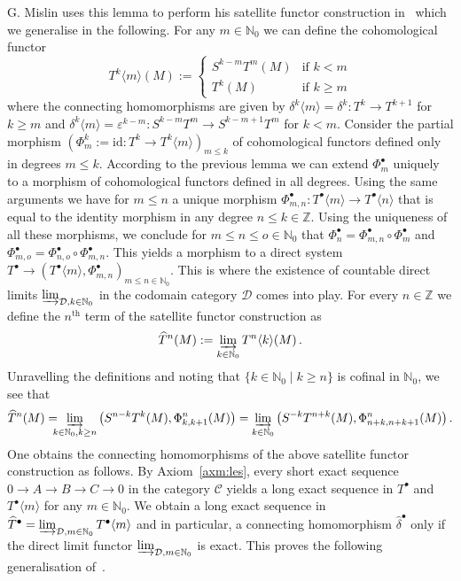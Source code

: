 \documentclass[12pt,a4paper]{article}
\numberwithin{equation}{section}
\theoremstyle{nonumberplain}
\begin{document}
G.\! Mislin uses this lemma to perform his satellite functor construction in~\cite[pp.~295--296]{mis94} which we generalise in the following. For any $m \in \mathbb{N}_0$ we can define the cohomological functor
\begin{equation}\label{eq:directsyscohomfunctor}
T^k \langle m \rangle (M) := \begin{cases} S^{k-m}T^m(M) &\text{if } k < m \\ T^k(M) &\text{if } k \geq m \end{cases}
\end{equation}
where the connecting homomorphisms are given by $\delta^k \langle m \rangle = \delta^k: T^k \rightarrow T^{k+1}$ for $k \geq m$ and $\delta^k \langle m \rangle = \varepsilon^{k-m}: S^{k-m}T^m \rightarrow S^{k-m+1}T^m$ for $k < m$. Consider the partial morphism $(\Phi_m^k := \mathrm{id}: T^k \rightarrow T^k \langle m \rangle)_{m \leq k}$ of cohomological functors defined only in degrees $m \leq k$. According to the previous lemma we can extend $\Phi_m^{\bullet}$ uniquely to a morphism of cohomological functors defined in all degrees. Using the same arguments we have for $m \leq n$ a unique morphism $\Phi_{m, n}^{\bullet}: T^{\bullet} \langle m \rangle \rightarrow T^{\bullet} \langle n \rangle$ that is equal to the identity morphism in any degree $n \leq k \in \mathbb{Z}$. Using the uniqueness of all these morphisms, we conclude for $m \leq n \leq o \in \mathbb{N}_0$ that $\Phi_n^{\bullet} = \Phi_{m,n}^{\bullet} \circ \Phi_m^{\bullet}$ and $\Phi_{m,o}^{\bullet} = \Phi_{n,o}^{\bullet} \circ \Phi_{m,n}^{\bullet}$. This yields a morphism to a direct system $T^{\bullet} \rightarrow (T^{\bullet} \langle m \rangle, \Phi_{m,n}^{\bullet})_{m \leq n \in \mathbb{N}_0}$. This is where the existence of countable direct limits $\varinjlim_{\mathcal{D}, k \in \mathbb{N}_0}$ in the codomain category $\mathcal{D}$ comes into play. For every $n \in \mathbb{Z}$ we define the $n^{\text{th}}$ term of the satellite functor construction as
\[ \widehat{T}^n(M) := \varinjlim_{k \in \mathbb{N}_0} T^n \langle k \rangle(M) \, . \]
Unravelling the definitions and noting that $\lbrace k \in \mathbb{N}_0 \mid k \geq n \rbrace$ is cofinal in $\mathbb{N}_0$, we see that
\begin{equation}\label{eq:expliciterms}
\widehat{T}^n(M) =\!\!\!\! \varinjlim_{k \in \mathbb{N}_0, k \geq n} \big(S^{n-k}T^k(M), \Phi_{k, k+1}^n(M) \big) = \varinjlim_{k \in \mathbb{N}_0} \big( S^{-k}T^{n+k}(M), \Phi_{n+k, n+k+1}^n(M) \big) \, .
\end{equation}
One obtains the connecting homomorphisms of the above satellite functor construction as follows. By Axiom~\ref{axm:les}, every short exact sequence $0 \rightarrow A \rightarrow B \rightarrow C \rightarrow 0$ in the category $\mathcal{C}$ yields a long exact sequence in $T^{\bullet}$ and $T^{\bullet} \langle m \rangle$ for any $m \in \mathbb{N}_0$. We obtain a long exact sequence in $\widehat{T}^{\bullet} = \varinjlim_{\mathcal{D}, m \in \mathbb{N}_0} T^{\bullet} \langle m \rangle$ and in particular, a connecting homomorphism $\widehat{\delta}^{\bullet}$ only if the direct limit functor $\varinjlim_{\mathcal{D}, m \in \mathbb{N}_0}$ is exact. This proves the following generalisation of~\cite[Theorem~2.2]{mis94}.
\end{document}
